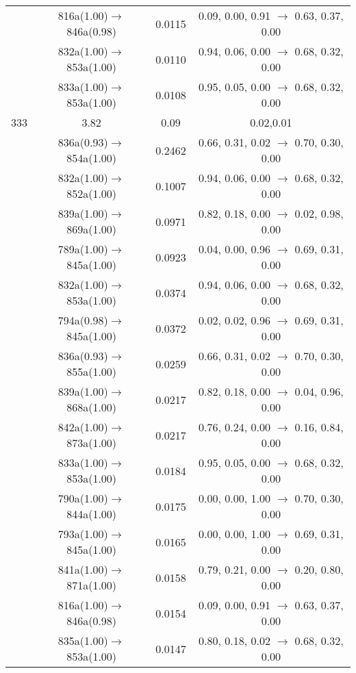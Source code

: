 \documentclass[10pt,a4paper]{article}
\begin{document}
\begin{longtable}{c|c|c|c}
 	& 816a(1.00)$\rightarrow$846a(0.98) &	 0.0115 &	 0.09, 0.00, 0.91 $\rightarrow$ 0.63, 0.37, 0.00 \\ 
 	& 832a(1.00)$\rightarrow$853a(1.00) &	 0.0110 &	 0.94, 0.06, 0.00 $\rightarrow$ 0.68, 0.32, 0.00 \\ 
 	& 833a(1.00)$\rightarrow$853a(1.00) &	 0.0108 &	 0.95, 0.05, 0.00 $\rightarrow$ 0.68, 0.32, 0.00 \\ 
 \hline333 &	 3.82 &	 0.09 &	 0.02,0.01 \\ 
  	& 836a(0.93)$\rightarrow$854a(1.00) &	 0.2462 &	 0.66, 0.31, 0.02 $\rightarrow$ 0.70, 0.30, 0.00 \\ 
 	& 832a(1.00)$\rightarrow$852a(1.00) &	 0.1007 &	 0.94, 0.06, 0.00 $\rightarrow$ 0.68, 0.32, 0.00 \\ 
 	& 839a(1.00)$\rightarrow$869a(1.00) &	 0.0971 &	 0.82, 0.18, 0.00 $\rightarrow$ 0.02, 0.98, 0.00 \\ 
 	& 789a(1.00)$\rightarrow$845a(1.00) &	 0.0923 &	 0.04, 0.00, 0.96 $\rightarrow$ 0.69, 0.31, 0.00 \\ 
 	& 832a(1.00)$\rightarrow$853a(1.00) &	 0.0374 &	 0.94, 0.06, 0.00 $\rightarrow$ 0.68, 0.32, 0.00 \\ 
 	& 794a(0.98)$\rightarrow$845a(1.00) &	 0.0372 &	 0.02, 0.02, 0.96 $\rightarrow$ 0.69, 0.31, 0.00 \\ 
 	& 836a(0.93)$\rightarrow$855a(1.00) &	 0.0259 &	 0.66, 0.31, 0.02 $\rightarrow$ 0.70, 0.30, 0.00 \\ 
 	& 839a(1.00)$\rightarrow$868a(1.00) &	 0.0217 &	 0.82, 0.18, 0.00 $\rightarrow$ 0.04, 0.96, 0.00 \\ 
 	& 842a(1.00)$\rightarrow$873a(1.00) &	 0.0217 &	 0.76, 0.24, 0.00 $\rightarrow$ 0.16, 0.84, 0.00 \\ 
 	& 833a(1.00)$\rightarrow$853a(1.00) &	 0.0184 &	 0.95, 0.05, 0.00 $\rightarrow$ 0.68, 0.32, 0.00 \\ 
 	& 790a(1.00)$\rightarrow$844a(1.00) &	 0.0175 &	 0.00, 0.00, 1.00 $\rightarrow$ 0.70, 0.30, 0.00 \\ 
 	& 793a(1.00)$\rightarrow$845a(1.00) &	 0.0165 &	 0.00, 0.00, 1.00 $\rightarrow$ 0.69, 0.31, 0.00 \\ 
 	& 841a(1.00)$\rightarrow$871a(1.00) &	 0.0158 &	 0.79, 0.21, 0.00 $\rightarrow$ 0.20, 0.80, 0.00 \\ 
 	& 816a(1.00)$\rightarrow$846a(0.98) &	 0.0154 &	 0.09, 0.00, 0.91 $\rightarrow$ 0.63, 0.37, 0.00 \\ 
 	& 835a(1.00)$\rightarrow$853a(1.00) &	 0.0147 &	 0.80, 0.18, 0.02 $\rightarrow$ 0.68, 0.32, 0.00 \\ 

\end{longtable}
\end{document}
